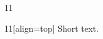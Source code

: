 \documentclass[paper=A4]{ropas-poster}
\begin{document}
\begin{postergrid}{1}{1}
\begin{posterblock}{1}{1}[align=top]
Short text.
\end{posterblock}
\end{postergrid}
\end{document}
